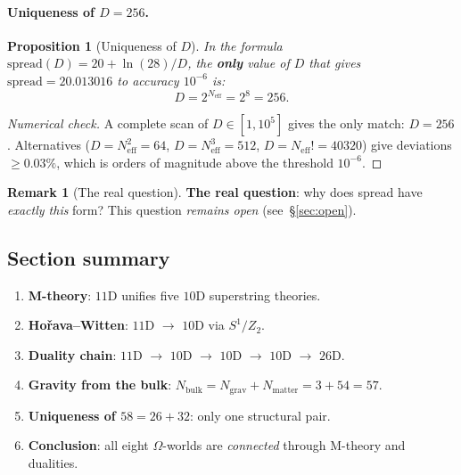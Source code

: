 \documentclass[11pt,a4paper]{article}
\newcommand{\Nbulk}{N_{\text{bulk}}}
\newtheorem{proposition}[theorem]{Proposition}
\theoremstyle{definition}
\newtheorem{remark}[theorem]{Remark}
\begin{document}
\paragraph{Uniqueness of $D = 256$.}
\begin{proposition}[Uniqueness of $D$]
\label{prop:uniqueness-d-review}
In the formula $\text{spread}(D) = 20 + \ln(28)/D$, the \textbf{only} 
value of $D$ that gives $\text{spread} = 20.013016$ to accuracy 
$10^{-6}$ is:
\begin{equation}
    \boxed{
    D = 2^{N_{\text{eff}}} = 2^8 = 256.
    }
    \label{eq:unique-d-review}
\end{equation}
\end{proposition}

\begin{proof}[Numerical check]
A complete scan of $D \in [1, 10^5]$ gives the only 
match: $D = 256$. Alternatives 
($D = N_{\text{eff}}^2 = 64$, $D = N_{\text{eff}}^3 = 512$, 
$D = N_{\text{eff}}! = 40320$) give deviations $\geq 0.03\%$, 
which is orders of magnitude above the threshold $10^{-6}$.
\end{proof}

\begin{remark}[The real question]
\label{rem:real-question-review}
\textbf{The real question}: why does spread have \emph{exactly 
this} form? This question \emph{remains open} (see~\S\ref{sec:open}).
\end{remark}

\subsection{Section summary}
\label{subsec:mtheory-summary}

\begin{enumerate}
    \item \textbf{M-theory}: $11$D unifies five $10$D superstring 
          theories.
    \item \textbf{Hořava--Witten}: $11$D $\to$ $10$D via 
          $S^1/Z_2$.
    \item \textbf{Duality chain}: $11$D $\to$ $10$D 
          $\to$ $10$D $\to$ $10$D $\to$ $26$D.
    \item \textbf{Gravity from the bulk}: 
          $\Nbulk = N_{\text{grav}} + N_{\text{matter}} = 3 + 54 = 57$.
    \item \textbf{Uniqueness of $58 = 26 + 32$}: only one 
          structural pair.
    \item \textbf{Conclusion}: all eight $\Omega$-worlds are \emph{connected} 
          through M-theory and dualities.
\end{enumerate}
\end{document}
